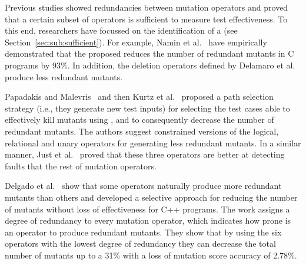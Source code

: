Previous studies showed redundancies between mutation operators and proved that a certain subset of operators is sufficient to measure test effectiveness. To this end, researchers have focussed on the identification of a  (see Section~\ref{sec:sub:sufficient}). 
For example, Namin et al.~\cite{siami2008sufficient} have empirically demonstrated that the proposed  reduces the number of redundant mutants in C programs by 93\%. 
In addition, the deletion operators defined by Delamaro et al.~\cite{delamaro2014designing} produce less redundant mutants.

Papadakis and Malevris~\cite{papadakis2012mutation} and then Kurtz et al.~\cite{kurtz2015static} proposed a path selection strategy (i.e., they generate new test inputs) for selecting the test cases able to effectively kill mutants using , and to consequently decrease the number of redundant mutants. 
The authors suggest constrained versions of the logical, relational and unary operators for generating less redundant mutants. 
In a similar manner, Just et al.~\cite{just2012redundant,just2015higher} proved that these three operators are better at detecting faults that the rest of mutation operators.

Delgado et al.~\cite{delgado2017assessment} show that some operators naturally produce more redundant mutants than others and
developed a selective approach for reducing the number of mutants without loss of effectiveness for C++ programs. 
The work assigns a degree of redundancy to every mutation operator, which indicates how prone is an operator to produce redundant mutants. They show that by using the six operators with the lowest degree of redundancy they can decrease the total number of mutants up to a 31\% with a loss of mutation score accuracy of 2.78\%.

